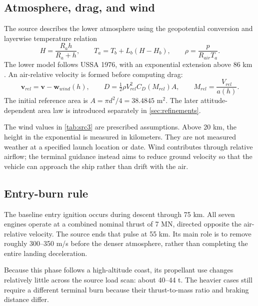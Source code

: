 \documentclass[11pt,a4paper]{article}
\newcommand{\vect}[1]{\bm{#1}}
\begin{document}
\subsection{Atmosphere, drag, and wind}
The source describes the lower atmosphere using the geopotential conversion and layerwise temperature relation
\begin{equation}
 H=\frac{R_ah}{R_a+h},\qquad
 T_a=T_b+L_b(H-H_b),\qquad \rho=\frac{p}{R_{air}T_a}.
\label{eq:atmo}
\end{equation}
The lower model follows USSA 1976, with an exponential extension above 86 km \cite{ussa}. An air-relative velocity is formed before computing drag:
\begin{equation}
 \vect v_{rel}=\vect v-\vect w_{wind}(h),\qquad
 D=\tfrac12\rho V_{rel}^2C_D(M_{rel})A,\qquad
 M_{rel}=\frac{V_{rel}}{a(h)}.
\end{equation}
The initial reference area is $A=\pi d^2/4=38.4845$ m$^2$. The later attitude-dependent area law is introduced separately in \cref{sec:refinements}.



The wind values in \cref{tab:src3} are prescribed assumptions. Above 20 km, the height in the exponential is measured in kilometers. They are not measured weather at a specified launch location or date. Wind contributes through relative airflow; the terminal guidance instead aims to reduce ground velocity so that the vehicle can approach the ship rather than drift with the air.

\subsection{Entry-burn rule}
The baseline entry ignition occurs during descent through 75 km. All seven engines operate at a combined nominal thrust of 7 MN, directed opposite the air-relative velocity. The source ends that pulse at 55 km. Its main role is to remove roughly 300--350 m/s before the denser atmosphere, rather than completing the entire landing deceleration.

Because this phase follows a high-altitude coast, its propellant use changes relatively little across the source load scan: about 40--44 t. The heavier cases still require a different terminal burn because their thrust-to-mass ratio and braking distance differ.
\end{document}

